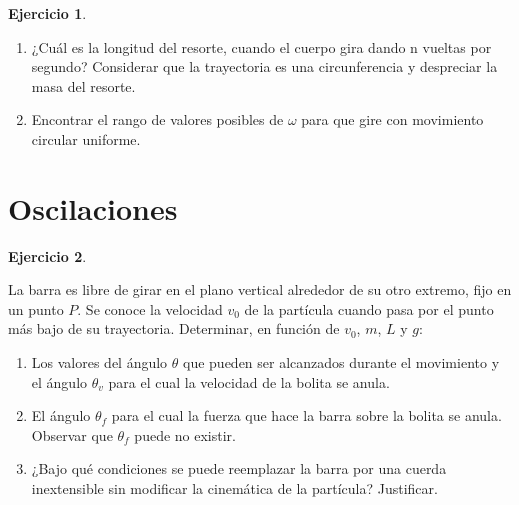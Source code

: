 \documentclass[a4paper,12pt,twoside]{book}
\newtheorem{ejercicio}{{Ejercicio}}[chapter]
\begin{document}
\begin{mdframed}[style=ejercicio-intermedio]
    \begin{ejercicio}
    \end{ejercicio}
    \begin{center}
        \def\svgwidth{0.5\linewidth}
        
    \end{center}
    \begin{enumerate}
        \item ¿Cuál es la longitud del resorte, cuando el cuerpo gira dando n vueltas por segundo? Considerar que la trayectoria es una circunferencia y despreciar la masa del resorte.
        \item Encontrar el rango de valores posibles de $\omega$ para que gire con movimiento circular uniforme.
    \end{enumerate}
\end{mdframed}


\section{Oscilaciones}

\begin{mdframed}[style=ejercicio-intermedio]
    \begin{ejercicio}
    \end{ejercicio}
    \begin{center}
        \def\svgwidth{0.4\linewidth}
        
    \end{center}
    La barra es libre de girar en el plano vertical alrededor de su otro extremo, fijo en un punto $P$.
    Se conoce la velocidad $v_0$ de la partícula cuando pasa por el punto más bajo de su trayectoria.
    Determinar, en función de $v_0$, $m$, $L$ y $g$:
    \begin{enumerate}
        \item Los valores del ángulo $\theta$ que pueden ser alcanzados durante el movimiento y el ángulo $\theta_v$ para el cual la velocidad de la bolita se anula.
        \item El ángulo $\theta_f$ para el cual la fuerza que hace la barra sobre la bolita se anula.
        Observar que  $\theta_f$ puede no existir.
        \item ¿Bajo qué condiciones se puede reemplazar la barra por una cuerda inextensible sin modificar la cinemática de la partícula? Justificar.
    \end{enumerate}
\end{mdframed}
\end{document}
